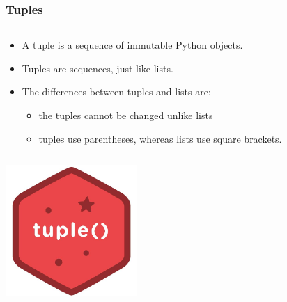 \documentclass{beamer}
\begin{document}
\begin{frame}
	\frametitle{Tuples}
	\begin{columns}[c]
		\begin{column}{30cm}
			\vspace{.05cm}
			\begin{itemize}
				\justifying
				\item A tuple is a sequence of immutable Python objects.
				\item Tuples are sequences, just like lists.
				\item The differences between tuples and lists are:
				\begin{itemize}
						\item the tuples cannot be changed unlike lists
						\item tuples use parentheses, whereas lists use square brackets.
				\end{itemize}
			\end{itemize}
		\end{column}
	\end{columns}
	\vspace{.1cm}
	\hspace*{5.5cm} \includegraphics[width=5cm]{figs/tuple.jpg}
\end{frame}
\end{document}
